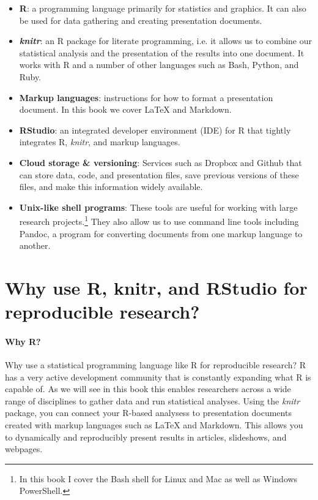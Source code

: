 \begin{itemize}
    \item {\bf{R}}: a programming language primarily for statistics and graphics. It can also be used for data gathering and creating presentation documents.
    
    \item {\bf{{\emph{knitr}}}}: an R package for literate programming, i.e. it allows us to combine our statistical analysis and the presentation of the results into one document. It works with R and a number of other languages such as Bash, Python, and Ruby.
    
    \item {\bf{Markup languages}}: instructions for how to format a presentation document. In this book we cover LaTeX and Markdown.  
    
    \item {\bf{RStudio}}: an integrated developer environment (IDE) for R that tightly integrates R, {\emph{knitr}}, and markup languages.
    
    \item {\bf{Cloud storage \& versioning}}: Services such as Dropbox and Github that can store data, code, and presentation files, save previous versions of these files, and make this information widely available.
    
    \item {\bf{Unix-like shell programs}}: These tools are useful for working with large research projects.\footnote{In this book I cover the Bash shell for Linux and Mac as well as Windows PowerShell.} They also allow us to use command line tools including Pandoc, a program for converting documents from one markup language to another.
\end{itemize}


\section{Why use R, knitr, and RStudio for reproducible research?}

\paragraph{Why R?}
Why use a statistical programming language like R for reproducible research? R has a very active development community that is constantly expanding what R is capable of. As we will see in this book this enables researchers across a wide range of disciplines to gather data and run statistical analyses. Using the {\emph{knitr}} package, you can connect your R-based analysess to presentation documents created with markup languages such as LaTeX and Markdown. This allows you to dynamically and reproducibly present results in articles, slideshows, and webpages. 

